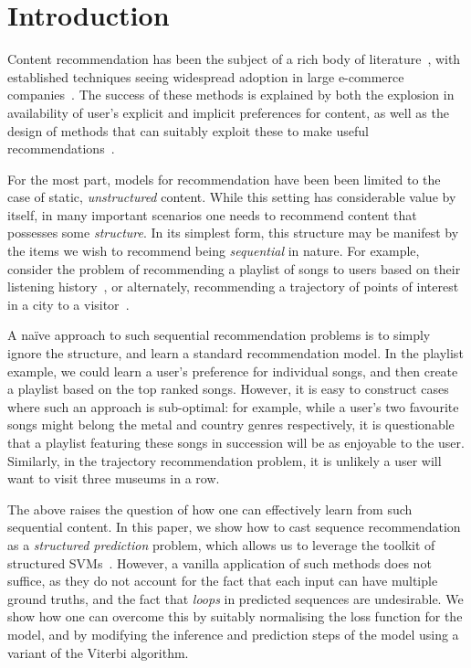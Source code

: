 
\section{Introduction}
\label{sec:intro}

Content recommendation has been the subject of a rich body of literature~\citep{Goldberg:1992,Resnick:1994,Konstan:1997,Sarwar:2001,Koren:2010},
with established techniques seeing widespread adoption in large e-commerce companies~\citep{Linden:2003,Agarwal:2013,Amatriain:2015,Gomez-Uribe:2015}.
The success of these methods is explained by both the explosion in availability of user's explicit and implicit preferences for content,
as well as the design of methods that can suitably exploit these to make useful recommendations~\citep{Koren:2009}.

For the most part, models for recommendation have been been limited to the case of static, \emph{unstructured} content.
While this setting has considerable value by itself,
in many important scenarios one needs to recommend content that possesses some \emph{structure}.
In its simplest form, this structure may be manifest by the items we wish to recommend being \emph{sequential} in nature.
For example, consider the problem of recommending a playlist of songs to users based on their listening history~\citep{McFee:2011,chen2012playlist},
or alternately,
recommending a trajectory of points of interest in a city to a visitor~\citep{lu2010photo2trip,ijcai15,lu2012personalized}.

A na\"{i}ve approach to such sequential recommendation problems is to simply ignore the structure,
and learn a standard recommendation model.
In the playlist example, we could learn a user's preference for individual songs,
and then create a playlist based on the top ranked songs.
However, it is easy to construct cases where such an approach is sub-optimal:
for example, while a user's two favourite songs might belong
the metal and country genres respectively,
it is questionable that a playlist featuring these songs in succession will be as enjoyable to the user.
Similarly, in the trajectory recommendation problem, it is unlikely a user will want to visit three museums in a row.

The above raises the question of how one can effectively learn from such sequential content.
In this paper, we show how to cast sequence recommendation as a \emph{structured prediction} problem,
which allows us to leverage the toolkit of structured SVMs~\citep{tsochantaridis2005large}.
However, a vanilla application of such methods does not suffice,
as they do not account for the fact that each input can have multiple ground truths,
and the fact that \emph{loops} in predicted sequences are undesirable.
We show how one can overcome this by
suitably normalising the loss function for the model,
and by modifying the inference and prediction steps of the model using a variant of the Viterbi algorithm.

